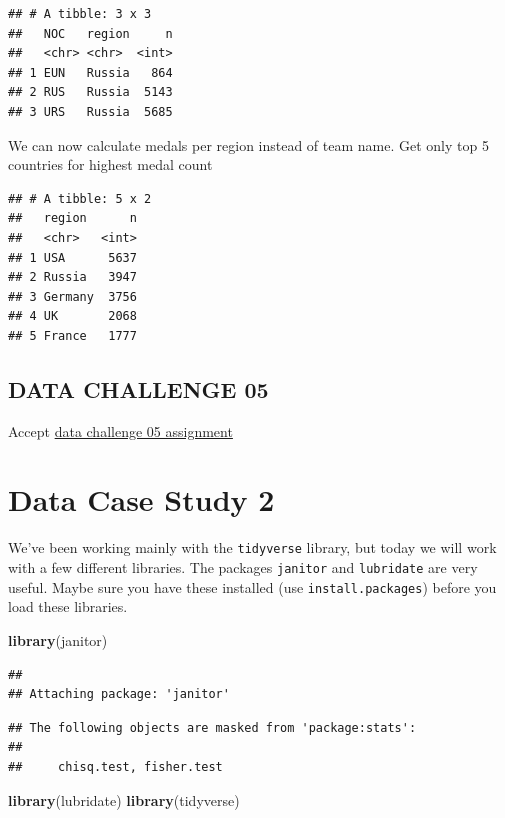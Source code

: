 \documentclass[
]{book}
\newenvironment{Shaded}{\begin{snugshade}}{\end{snugshade}}
\newcommand{\KeywordTok}[1]{\textcolor[rgb]{0.13,0.29,0.53}{\textbf{#1}}}
\newcommand{\NormalTok}[1]{#1}
\begin{document}
\begin{verbatim}
## # A tibble: 3 x 3
##   NOC   region     n
##   <chr> <chr>  <int>
## 1 EUN   Russia   864
## 2 RUS   Russia  5143
## 3 URS   Russia  5685
\end{verbatim}

We can now calculate medals per region instead of team name.
Get only top 5 countries for highest medal count

\begin{verbatim}
## # A tibble: 5 x 2
##   region      n
##   <chr>   <int>
## 1 USA      5637
## 2 Russia   3947
## 3 Germany  3756
## 4 UK       2068
## 5 France   1777
\end{verbatim}

\hypertarget{data-challenge-05}{%
\section{DATA CHALLENGE 05}\label{data-challenge-05}}

Accept \href{https://classroom.github.com/a/6eey650g}{data challenge 05 assignment}

\hypertarget{data-case-study-2}{%
\chapter{Data Case Study 2}\label{data-case-study-2}}

We've been working mainly with the \texttt{tidyverse} library, but today we will work with a few different libraries. The packages \texttt{janitor} and \texttt{lubridate} are very useful. Maybe sure you have these installed (use \texttt{install.packages}) before you load these libraries.

\begin{Shaded}
\begin{Highlighting}[]
\KeywordTok{library}\NormalTok{(janitor)}
\end{Highlighting}
\end{Shaded}

\begin{verbatim}
## 
## Attaching package: 'janitor'
\end{verbatim}

\begin{verbatim}
## The following objects are masked from 'package:stats':
## 
##     chisq.test, fisher.test
\end{verbatim}

\begin{Shaded}
\begin{Highlighting}[]
\KeywordTok{library}\NormalTok{(lubridate)}
\KeywordTok{library}\NormalTok{(tidyverse)}
\end{Highlighting}
\end{Shaded}
\end{document}
